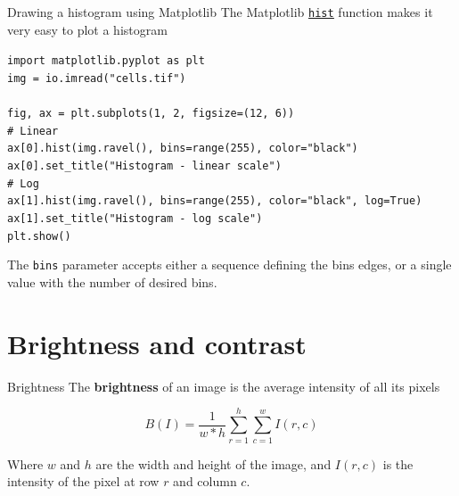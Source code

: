 \documentclass[9pt, aspectratio=169]{beamer}
\begin{document}
\begin{frame}
    {Drawing a histogram using Matplotlib}
    The Matplotlib \href{https://matplotlib.org/stable/api/_as_gen/matplotlib.pyplot.hist.html}{\underline{\texttt{hist}}} function makes it very easy to plot a histogram

    \begin{codebox}
        \texttt{import matplotlib.pyplot as plt\\
            img = io.imread("cells.tif")\\
            \\
            fig, ax = plt.subplots(1, 2, figsize=(12, 6))\\
            \# Linear\\
            ax[0].hist(img.ravel(), bins=range(255), color="black")\\
            ax[0].set\_title("Histogram - linear scale")\\
            \pause
            \# Log\\
            ax[1].hist(img.ravel(), bins=range(255), color="black", log=True)\\
            ax[1].set\_title("Histogram - log scale")\\
            plt.show()}
    \end{codebox}

    The \texttt{bins} parameter accepts either a sequence defining the bins edges, or a single value with the number of desired bins.
\end{frame}

\section {Brightness and contrast}

\begin{frame}
    {Brightness}
    The \textbf{brightness} of an image is the average intensity of all its pixels

    $$B(I) = \frac{1}{w*h}\sum_{r=1}^{h}\sum_{c=1}^{w}I(r,c)$$

    Where $w$ and $h$ are the width and height of the image, and $I(r,c)$ is the intensity of the pixel at row $r$ and column $c$.
    \pause
\end{frame}
\end{document}
